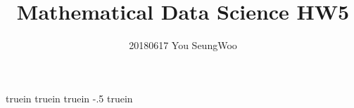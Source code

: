  truein 
 truein 
 truein 
\topmargin -.5 truein 
\textheight 8.5in
\setlength{\parindent}{0pt}
\hypersetup{
	colorlinks=true,
	linkcolor=red,
	filecolor=magenta,      
	urlcolor=cyan,
}


\title{Mathematical Data Science HW5}
\author{20180617 You SeungWoo}